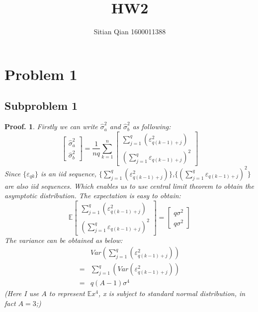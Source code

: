 \documentclass{article}
\theoremstyle{break}
\newtheorem*{proof_break}{Proof.}
\begin{document}
    \title{HW2}
    \author{Sitian Qian 1600011388}
    \maketitle

    \section{Problem 1}
    \subsection{Subproblem 1}
    \begin{proof_break}\par
        Firstly we can write $\hat{\sigma}_a^2$ and $\hat{\sigma}_b^2$ as following:
        $$\left[\begin{array}{c}{\hat{\sigma}_{a}^{2}} \\ {\hat{\sigma}_{b}^{2}}\end{array}\right]=\frac{1}{nq} \sum_{k=1}^{n}\left[\begin{array}{c}{\sum_{j=1}^{q}(\varepsilon_{q(k-1)+j}^2)} \\ {(\sum_{j=1}^{q}\varepsilon_{q(k-1)+j})^{2}}\end{array}\right]$$
        Since $\{\varepsilon_{qk}\}$ is an iid sequence, $\{\sum_{j=1}^{q}(\varepsilon_{q(k-1)+j}^2)\}$,$\{(\sum_{j=1}^{q}\varepsilon_{q(k-1)+j})^{2}\}$ are also iid sequences. Which enables us to use central limit theorem to obtain the
        asymptotic distribution.\newline
        The expectation is easy to obtain: 
        $$\mathbb{E}\left[\begin{array}{c}{\sum_{j=1}^{q}(\varepsilon_{q(k-1)+j}^2)} \\ {(\sum_{j=1}^{q}\varepsilon_{q(k-1)+j})^{2}}\end{array}\right]=\left[\begin{array}{l}{q \sigma^{2}} \\ {q \sigma^{2}}\end{array}\right]$$
        The variance can be obtained as below: 
        \begin{align*}
            &Var(\sum_{j=1}^{q}(\varepsilon_{q(k-1)+j}^2))\\
            =&\sum_{j=1}^q(Var(\varepsilon^2_{q(k-1)+j}))\\
            =&q(A-1)\sigma^4
        \end{align*}
        (Here I use $A$ to represent $\mathbb{E}{x}^4$, x is subject to standard normal distribution, in fact $A=3$;)

\end{proof_break}
\end{document}

